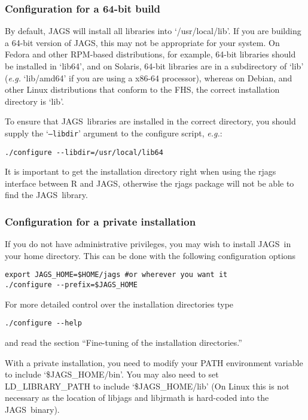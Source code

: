 \documentclass[11pt, a4paper, titlepage]{article}
\newcommand{\JAGS}{\textsf{JAGS}}
\newcommand{\code}[1]{{\bgroup{\normalfont\ttfamily #1}\egroup}}
\newcommand{\samp}[1]{{`\bgroup\normalfont\texttt{#1}'\egroup}}
\newcommand{\file}[1]{{`\normalfont\textsf{#1}'}}
\let\option=\samp
\begin{document}
\subsubsection{Configuration for a 64-bit build}

By default, JAGS will install all libraries into
\file{/usr/local/lib}.  If you are building a 64-bit version of \JAGS,
this may not be appropriate for your system. On Fedora and other
RPM-based distributions, for example, 64-bit libraries should be
installed in \file{lib64}, and on Solaris, 64-bit libraries are in a
subdirectory of \file{lib} ({\em e.g.} \file{lib/amd64} if you are
using a x86-64 processor), whereas on Debian, and other Linux
distributions that conform to the FHS, the correct installation
directory is \file{lib}.

To ensure that \JAGS\ libraries are installed in the correct
directory, you should supply the \option{--libdir} argument to the
configure script, {\em e.g.}:
\begin{verbatim}
./configure --libdir=/usr/local/lib64
\end{verbatim}

It is important to get the installation directory right when using the
\code{rjags} interface between R and \JAGS, otherwise the
\code{rjags} package will not be able to find the \JAGS\ library.

\subsubsection{Configuration for a private installation}

If you do not have administrative privileges, you may wish to install
\JAGS\ in your home directory. This can be done with the following
configuration options
\begin{verbatim}
export JAGS_HOME=$HOME/jags #or wherever you want it
./configure --prefix=$JAGS_HOME
\end{verbatim}
For more detailed control over the installation directories type
\begin{verbatim}
./configure --help
\end{verbatim}
and read the section ``Fine-tuning of the installation directories.''

With a private installation, you need to modify your PATH environment
variable to include \file{\$JAGS\_HOME/bin}. You may also need to set
\code{LD\_LIBRARY\_PATH} to include \file{\$JAGS\_HOME/lib} (On Linux this
is not necessary as the location of libjags and libjrmath is hard-coded
into the \JAGS\ binary).
\end{document}

